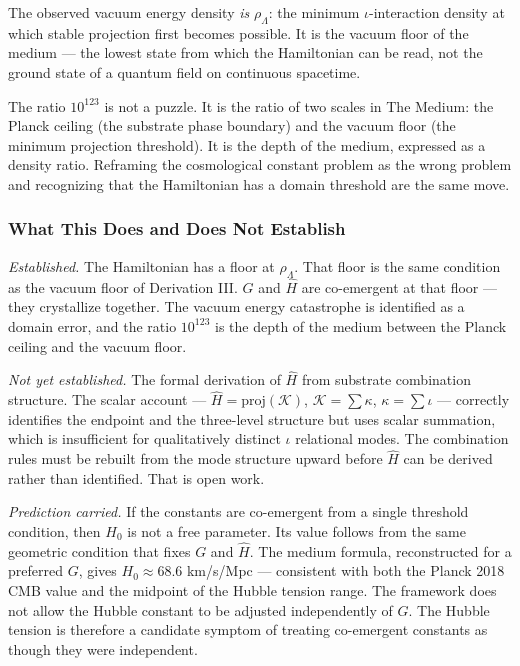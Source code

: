 \documentclass[11pt,letterpaper]{article}
\newcommand{\Kappa}{\mathcal{K}}
\begin{document}
The observed vacuum energy density \emph{is} \(\rho_\Lambda\): the minimum \(\iota\)-interaction density at which stable projection first becomes possible. It is the vacuum floor of the medium --- the lowest state from which the Hamiltonian can be read, not the ground state of a quantum field on continuous spacetime.

The ratio \(10^{123}\) is not a puzzle. It is the ratio of two scales in The Medium: the Planck ceiling (the substrate phase boundary) and the vacuum floor (the minimum projection threshold). It is the depth of the medium, expressed as a density ratio. Reframing the cosmological constant problem as the wrong problem and recognizing that the Hamiltonian has a domain threshold are the same move.

\subsubsection{What This Does and Does Not Establish}
\label{sec:orgadf376d}

\emph{Established.} The Hamiltonian has a floor at \(\rho_\Lambda\). That floor is the same condition as the vacuum floor of Derivation III. \(G\) and \(\hat{H}\) are co-emergent at that floor --- they crystallize together. The vacuum energy catastrophe is identified as a domain error, and the ratio \(10^{123}\) is the depth of the medium between the Planck ceiling and the vacuum floor.

\emph{Not yet established.} The formal derivation of \(\hat{H}\) from substrate combination structure. The scalar account --- \(\hat{H} = \mathrm{proj}(\Kappa)\), \(\Kappa = \sum \kappa\), \(\kappa = \sum \iota\) --- correctly identifies the endpoint and the three-level structure but uses scalar summation, which is insufficient for qualitatively distinct \(\iota\) relational modes. The combination rules must be rebuilt from the mode structure upward before \(\hat{H}\) can be derived rather than identified. That is open work.

\emph{Prediction carried.} If the constants are co-emergent from a single threshold condition, then \(H_0\) is not a free parameter. Its value follows from the same geometric condition that fixes \(G\) and \(\hat{H}\). The medium formula, reconstructed for a preferred \(G\), gives \(H_0 \approx 68.6\) km/s/Mpc --- consistent with both the Planck 2018 CMB value and the midpoint of the Hubble tension range. The framework does not allow the Hubble constant to be adjusted independently of \(G\). The Hubble tension is therefore a candidate symptom of treating co-emergent constants as though they were independent.
\end{document}
